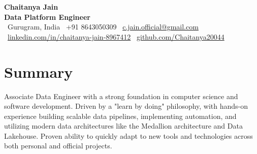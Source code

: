 \documentclass[10pt, a4paper]{article}
\begin{document}
\pagestyle{empty}

\begin{center}
    {\Huge \textbf{Chaitanya Jain}} \\ \vspace{4mm}
    {\large \textbf{Data Platform Engineer}} \\ \vspace{2mm}
    \small
    \faMapMarker \ Gurugram, India \quad
    \faPhone \ +91 8643050309 \quad
    \faEnvelope \ \href{mailto:c.jain.official@gmail.com}{c.jain.official@gmail.com} \\ \vspace{1mm}
    \faLinkedin \ \href{https://www.linkedin.com/in/chaitanya-jain-8967412}{linkedin.com/in/chaitanya-jain-8967412} \quad
    \faGithub \ \href{https://github.com/Chaitanya20044}{github.com/Chaitanya20044}
\end{center}

\section*{Summary}
\small{Associate Data Engineer with a strong foundation in computer science and software development. Driven by a "learn by doing" philosophy, with hands-on experience building scalable data pipelines, implementing automation, and utilizing modern data architectures like the Medallion architecture and Data Lakehouse. Proven ability to quickly adapt to new tools and technologies across both personal and official projects.}

\end{document}
